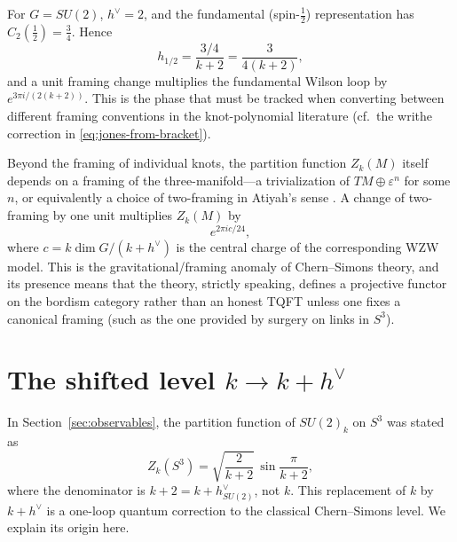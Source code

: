 \begin{example}\label{ex:appC-framing-SU2}
For $G = SU(2)$, $h^\vee = 2$, and the fundamental (spin-$\frac{1}{2}$) representation has $C_2(\tfrac{1}{2}) = \frac{3}{4}$. Hence
\begin{equation*}
h_{1/2} = \frac{3/4}{k+2} = \frac{3}{4(k+2)},
\end{equation*}
and a unit framing change multiplies the fundamental Wilson loop by $e^{3\pi i/(2(k+2))}$. This is the phase that must be tracked when converting between different framing conventions in the knot-polynomial literature (cf.\ the writhe correction in \eqref{eq:jones-from-bracket}).
\end{example}

\begin{remark}\label{rem:appC-manifold-framing}
Beyond the framing of individual knots, the partition function $Z_k(M)$ itself depends on a framing of the three-manifold---a trivialization of $TM\oplus \varepsilon^n$ for some $n$, or equivalently a choice of two-framing in Atiyah's sense \cite{Atiyah1990Geometry}. A change of two-framing by one unit multiplies $Z_k(M)$ by
\begin{equation}\label{eq:appC-central-charge-phase}
e^{2\pi i c/24},
\end{equation}
where $c = k\dim G/(k+h^\vee)$ is the central charge of the corresponding WZW model. This is the gravitational/framing anomaly of Chern--Simons theory, and its presence means that the theory, strictly speaking, defines a projective functor on the bordism category rather than an honest TQFT unless one fixes a canonical framing (such as the one provided by surgery on links in $S^3$).
\end{remark}

\section{The shifted level \texorpdfstring{$k\to k+h^\vee$}{k -> k + h-dual}}\label{sec:appC-shift}

In Section~\ref{sec:observables}, the partition function of $SU(2)_k$ on $S^3$ was stated as
\begin{equation*}
Z_k(S^3) = \sqrt{\frac{2}{k+2}}\,\sin\frac{\pi}{k+2},
\end{equation*}
where the denominator is $k+2 = k + h^\vee_{SU(2)}$, not $k$. This replacement of $k$ by $k+h^\vee$ is a one-loop quantum correction to the classical Chern--Simons level. We explain its origin here.


